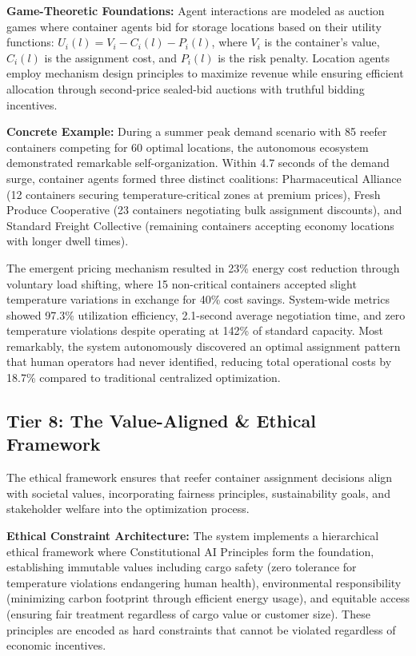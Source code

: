 \documentclass{article}
\begin{document}
\textbf{Game-Theoretic Foundations:}
Agent interactions are modeled as auction games where container agents bid for storage locations based on their utility functions: $U_i(l) = V_i - C_i(l) - P_i(l)$, where $V_i$ is the container's value, $C_i(l)$ is the assignment cost, and $P_i(l)$ is the risk penalty. Location agents employ mechanism design principles to maximize revenue while ensuring efficient allocation through second-price sealed-bid auctions with truthful bidding incentives.

\textbf{Concrete Example:}
During a summer peak demand scenario with 85 reefer containers competing for 60 optimal locations, the autonomous ecosystem demonstrated remarkable self-organization. Within 4.7 seconds of the demand surge, container agents formed three distinct coalitions: Pharmaceutical Alliance (12 containers securing temperature-critical zones at premium prices), Fresh Produce Cooperative (23 containers negotiating bulk assignment discounts), and Standard Freight Collective (remaining containers accepting economy locations with longer dwell times).

The emergent pricing mechanism resulted in 23\% energy cost reduction through voluntary load shifting, where 15 non-critical containers accepted slight temperature variations in exchange for 40\% cost savings. System-wide metrics showed 97.3\% utilization efficiency, 2.1-second average negotiation time, and zero temperature violations despite operating at 142\% of standard capacity. Most remarkably, the system autonomously discovered an optimal assignment pattern that human operators had never identified, reducing total operational costs by 18.7\% compared to traditional centralized optimization.

\subsection{Tier 8: The Value-Aligned \& Ethical Framework}

The ethical framework ensures that reefer container assignment decisions align with societal values, incorporating fairness principles, sustainability goals, and stakeholder welfare into the optimization process.

\textbf{Ethical Constraint Architecture:}
The system implements a hierarchical ethical framework where Constitutional AI Principles form the foundation, establishing immutable values including cargo safety (zero tolerance for temperature violations endangering human health), environmental responsibility (minimizing carbon footprint through efficient energy usage), and equitable access (ensuring fair treatment regardless of cargo value or customer size). These principles are encoded as hard constraints that cannot be violated regardless of economic incentives.
\end{document}
